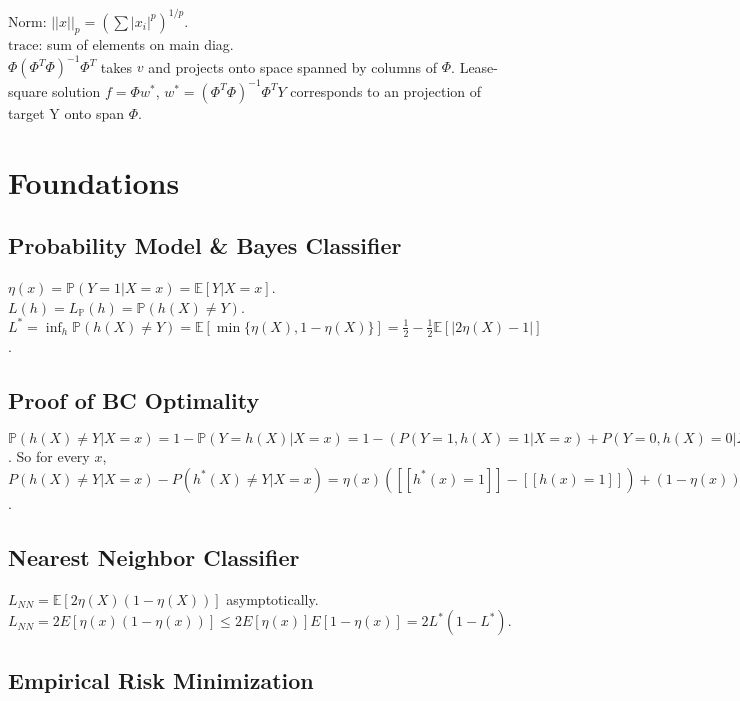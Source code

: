 Norm: $||x||_p = (\sum |x_i|^p)^{1/p}$.\\
$\text{trace}$: sum of elements on main diag.\\
$\Phi(\Phi^T \Phi)^{-1}\Phi^T$ takes $v$ and projects onto space spanned by columns of $\Phi$. Lease-square solution $f=\Phi w^*$, $w^*=(\Phi^T \Phi)^{-1}\Phi^T Y$ corresponds to an projection of target Y onto span $\Phi$.

\section{Foundations}

\subsection*{Probability Model \& Bayes Classifier}

$\eta(x) = \mathbb{P}(Y=1|X=x) = \mathbb{E}[Y|X=x]$.\\
$L(h) = L_{\mathbb{P}}(h) = \mathbb{P}(h(X)\neq Y)$.\\
$L^* = \inf_h \mathbb{P}(h(X) \neq Y) = \mathbb{E}[\min\{\eta(X), 1-\eta(X)\}] = \frac{1}{2} - \frac{1}{2}\mathbb{E}[|2\eta(X) - 1|]$.

\subsection*{Proof of BC Optimality}

\begin{mdframed}
$\mathbb{P}(h(X) \neq Y | X = x) = 1 - \mathbb{P}(Y = h(X)|X=x) = 1 - (P(Y=1,h(X)=1|X=x) + P(Y=0,h(X)=0|X=x)) = 1 - ([[h(x)=1]]P(Y=1|X=x) + [[h(x)=0]]P(Y=0|X=x)) = 1 - ([[h(x)=1]]\eta(x) + [[h(x)=0]](1-\eta(x)))$. So for every $x$, $P(h(X) \neq Y|X=x) - P(h^*(X) \neq Y | X=x) = \eta(x)([[h^*(x)=1]] - [[h(x)=1]]) + (1-\eta(x))([[h^*(x)=0]]-[[h(x)=0]]) = (2\eta(x) - 1)([[h^*(x)=1]]-[[h(x)=1]]) \geq 0$.
\end{mdframed}

\subsection*{Nearest Neighbor Classifier}

$L_{NN} = \mathbb{E}[2\eta(X)(1-\eta(X))]$ asymptotically.\\
$L_{NN} = 2E[\eta(x)(1-\eta(x))] \leq 2E[\eta(x)]E[1-\eta(x)] = 2L^*(1-L^*)$.

\subsection*{Empirical Risk Minimization}

